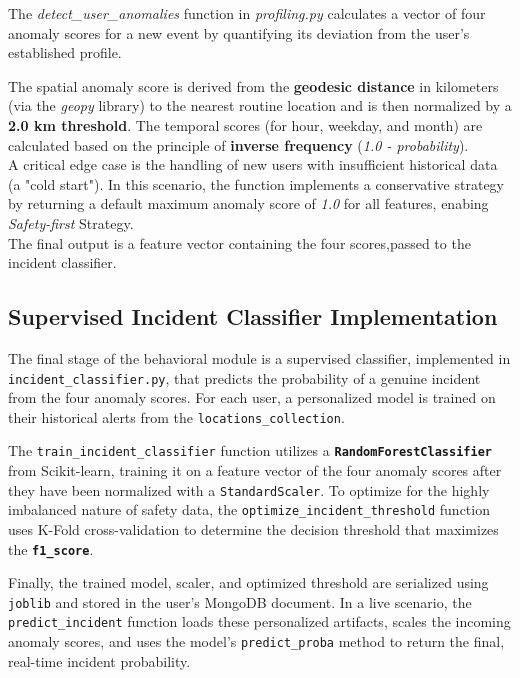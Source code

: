 \documentclass[12pt,a4paper,oneside,english]{book}
\begin{document}
The \textit{detect\_user\_anomalies} function in \textit{profiling.py} calculates a vector of four anomaly scores for a new event by quantifying its deviation from the user's established profile.

The spatial anomaly score is derived from the \textbf{geodesic distance} in kilometers (via the \textit{geopy} library) to the nearest routine location and is then normalized by a \textbf{2.0 km threshold}. The temporal scores (for hour, weekday, and month) are calculated based on the principle of \textbf{inverse frequency} (\textit{1.0 - probability}).
\\A critical edge case is the handling of new users with insufficient historical data (a "cold start"). In this scenario, the function implements a conservative strategy by returning a default maximum anomaly score of \textit{1.0} for all features, enabing \textit{Safety-first} Strategy.
\\The final output is a feature vector containing the four scores,passed to the incident classifier.
\subsection{Supervised Incident Classifier Implementation}
\label{sec:Incident_class_impl}

The final stage of the behavioral module is a supervised classifier, implemented in \texttt{incident\_classifier.py}, that predicts the probability of a genuine incident from the four anomaly scores. For each user, a personalized model is trained on their historical alerts from the \texttt{locations\_collection}.

The \texttt{train\_incident\_classifier} function utilizes a \textbf{\texttt{RandomForestClassifier}} from Scikit-learn, training it on a feature vector of the four anomaly scores after they have been normalized with a \texttt{StandardScaler}. To optimize for the highly imbalanced nature of safety data, the \texttt{optimize\_incident\_threshold} function uses K-Fold cross-validation to determine the decision threshold that maximizes the \textbf{\texttt{f1\_score}}.

Finally, the trained model, scaler, and optimized threshold are serialized using \texttt{joblib} and stored in the user's MongoDB document. In a live scenario, the \texttt{predict\_incident} function loads these personalized artifacts, scales the incoming anomaly scores, and uses the model's \texttt{predict\_proba} method to return the final, real-time incident probability.
\end{document}
